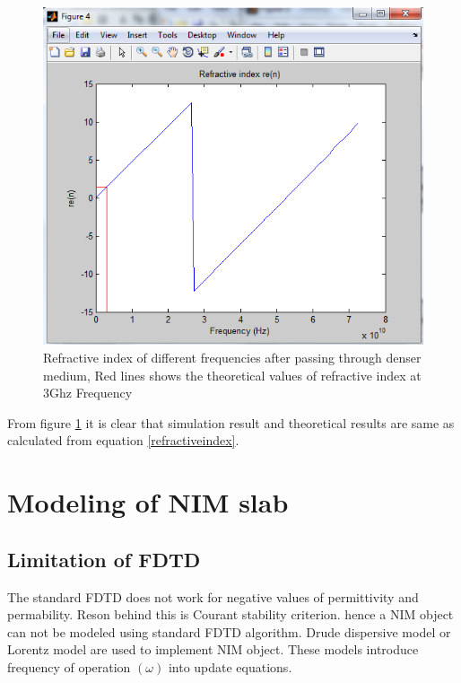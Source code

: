 \begin{figure}[htbp]
	\centering
		\includegraphics[width=5in]{Figures/ri1.png}
	\caption[Refractive index of different frequencies after passing through denser medium]{Refractive index of different frequencies after passing through denser medium, Red lines shows the theoretical values of refractive index at 3Ghz Frequency}
	\label{fig:ri1}
\end{figure}
From figure \ref{fig:ri1} it is clear that simulation result and theoretical results are same as calculated from equation \eqref{refractiveindex}.
\section{Modeling of NIM slab }
\subsection{Limitation of FDTD}
The standard FDTD does not work for negative values of permittivity and permability. Reson behind this is Courant stability criterion. hence a NIM object can not be modeled using standard FDTD algorithm. Drude dispersive model or Lorentz model are used to implement NIM object. These models introduce frequency of operation $(\omega)$ into update equations.
